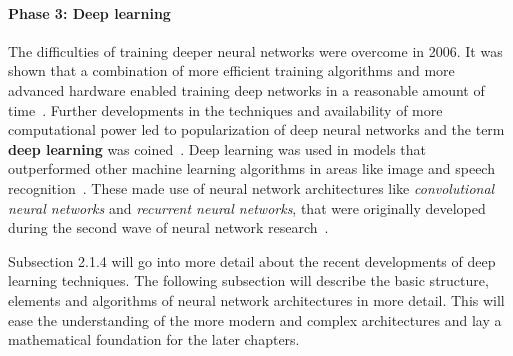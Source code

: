 \paragraph{Phase 3: Deep learning}

The difficulties of training deeper neural networks were overcome in 2006.
It was shown that a combination of more efficient training algorithms and
more advanced hardware enabled training deep networks in a reasonable amount of 
time~\cite{Hinton2006, Holden2006}.
Further developments in the techniques and availability of more computational
power led to popularization of deep neural networks and the term \textbf{deep
learning} was coined~\cite{Goodfellow2016, LeCun2015}.
Deep learning was used in models that outperformed other machine learning
algorithms in areas like image and speech recognition~\cite{Krizhevsky2012, Hinton2012}. 
These made use of neural network architectures like \textit{convolutional neural networks} 
and \textit{recurrent neural networks}, that were originally developed during 
the second wave of neural network research~\cite{Fukushima1980, Hochreiter1997, LeCun1998}.

Subsection 2.1.4 will go into more detail about the recent developments of
deep learning techniques. The following subsection will describe the basic
structure, elements and algorithms of neural network architectures in more
detail. This will ease the understanding of the more modern and complex
architectures and lay a mathematical foundation for the later chapters.
